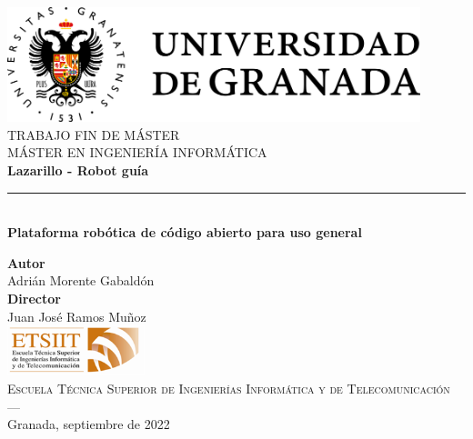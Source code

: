 \begin{titlepage}

\newlength{\centeroffset}
\setlength{\centeroffset}{-0.5\oddsidemargin}
\addtolength{\centeroffset}{0.5\evensidemargin}
\thispagestyle{empty}

\noindent\hspace*{\centeroffset}\begin{minipage}{\textwidth}

\centering
\includegraphics[width=0.9\textwidth]{imagenes/ugr.png}\\[1.4cm]

\textsc{\Large TRABAJO FIN DE MÁSTER\\[0.2cm]}
\textsc{MÁSTER EN INGENIERÍA INFORMÁTICA}\\[1cm]
% 
{\Huge\bfseries Lazarillo - Robot guía\\
}
\noindent\rule[-1ex]{\textwidth}{3pt}\\[3.5ex]
{\large\bfseries Plataforma robótica de código abierto para uso general}
\end{minipage}

\vspace{2.5cm}
\noindent\hspace*{\centeroffset}\begin{minipage}{\textwidth}
\centering

\textbf{Autor}\\ {Adrián Morente Gabaldón}\\[2.5ex]
\textbf{Director}\\
{Juan José Ramos Muñoz}\\[2cm]
\includegraphics[width=0.3\textwidth]{imagenes/etsiit_logo.png}\\[0.1cm]
\textsc{Escuela Técnica Superior de Ingenierías Informática y de Telecomunicación}\\
\textsc{---}\\
Granada, septiembre de 2022
\end{minipage}
\end{titlepage}

